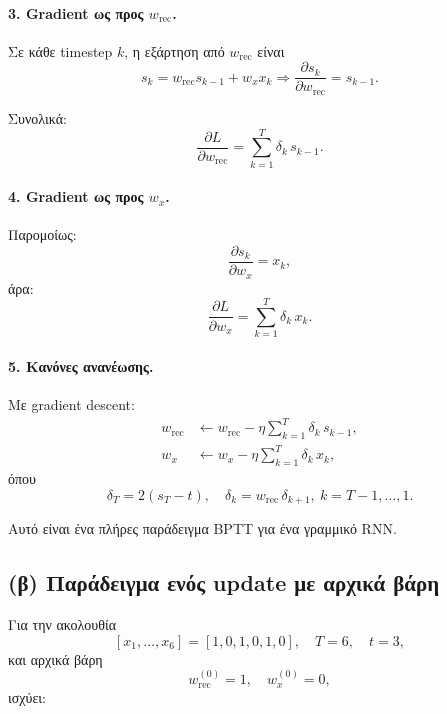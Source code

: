 \documentclass[a4paper,11pt]{article}
\begin{document}
\paragraph{3. Gradient ως προς $w_{\mathrm{rec}}$.}

Σε κάθε timestep $k$, η εξάρτηση από $w_{\mathrm{rec}}$ είναι
\[
s_k = w_{\mathrm{rec}} s_{k-1} + w_x x_k
\Rightarrow
\frac{\partial s_k}{\partial w_{\mathrm{rec}}} = s_{k-1}.
\]

Συνολικά:
\[
\boxed{
\frac{\partial L}{\partial w_{\mathrm{rec}}}
= \sum_{k=1}^T \delta_k\, s_{k-1}.
}
\]

\paragraph{4. Gradient ως προς $w_x$.}

Παρομοίως:
\[
\frac{\partial s_k}{\partial w_x} = x_k,
\]
άρα:
\[
\boxed{
\frac{\partial L}{\partial w_x}
= \sum_{k=1}^T \delta_k\, x_k.
}
\]

\paragraph{5. Κανόνες ανανέωσης.}

Με gradient descent:
\[
\boxed{
\begin{aligned}
w_{\mathrm{rec}} &\leftarrow
    w_{\mathrm{rec}} - \eta \sum_{k=1}^T \delta_k\, s_{k-1},\\[4pt]
w_x &\leftarrow
    w_x - \eta \sum_{k=1}^T \delta_k\, x_k,
\end{aligned}
}
\]
όπου
\[
\delta_T = 2(s_T - t),\quad
\delta_k = w_{\mathrm{rec}}\, \delta_{k+1},\ k=T-1,\dots,1.
\]

Αυτό είναι ένα πλήρες παράδειγμα BPTT για ένα γραμμικό RNN.

\subsection{(β) Παράδειγμα ενός update με αρχικά βάρη}

Για την ακολουθία
\[
[x_1,\dots,x_6] = [1,0,1,0,1,0],\quad T=6,\quad t=3,
\]
και αρχικά βάρη
\[
w_{\mathrm{rec}}^{(0)}=1,\quad w_x^{(0)}=0,
\]
ισχύει:
\end{document}
